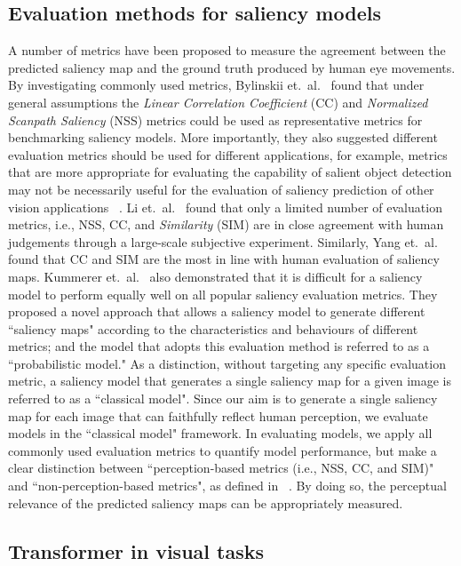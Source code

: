 \documentclass{article}
\begin{document}
\subsection{Evaluation methods for saliency models}    
A number of metrics have been proposed to measure the agreement between the predicted saliency map and the ground truth produced by human eye movements. By investigating commonly used metrics, Bylinskii et.~al.~\cite{Bylinskii_2019} found that under general assumptions the \textit{Linear Correlation Coefficient} (CC) and \textit{Normalized Scanpath Saliency} (NSS) metrics could be used as representative metrics for benchmarking saliency models. More importantly, they also suggested different evaluation metrics should be used for different applications, for example, metrics that are more appropriate for evaluating the capability of salient object detection may not be necessarily useful for the evaluation of saliency prediction of other vision applications ~\cite{Bylinskii_2019,xiaohan}. Li et.~al.~\cite{LIJ} found that only a limited number of evaluation metrics, i.e., NSS, CC, and \textit{Similarity} (SIM) are in close agreement with human judgements through a large-scale subjective experiment. Similarly, Yang et.~al.~\cite{xiaohan} found that CC and SIM are the most in line with human evaluation of saliency maps. Kummerer et.~al.~\cite{kummerer2018} also demonstrated that it is difficult for a saliency model to perform equally well on all popular saliency evaluation metrics. They proposed a novel approach that allows a saliency model to generate different ``saliency maps" according to the characteristics and behaviours of different metrics; and the model that adopts this evaluation method is referred to as a ``probabilistic model." As a distinction, without targeting any specific evaluation metric, a saliency model that generates a single saliency map for a given image is referred to as a ``classical model". Since our aim is to generate a single saliency map for each image that can faithfully reflect human perception, we evaluate models in the ``classical model" framework. In evaluating models, we apply all commonly used evaluation metrics to quantify model performance, but make a clear distinction between ``perception-based metrics (i.e., NSS, CC, and SIM)" and ``non-perception-based metrics", as defined in ~\cite{Bylinskii_2019}. By doing so, the perceptual relevance of the predicted saliency maps can be appropriately measured. 

\subsection{Transformer in visual tasks}
\end{document}
